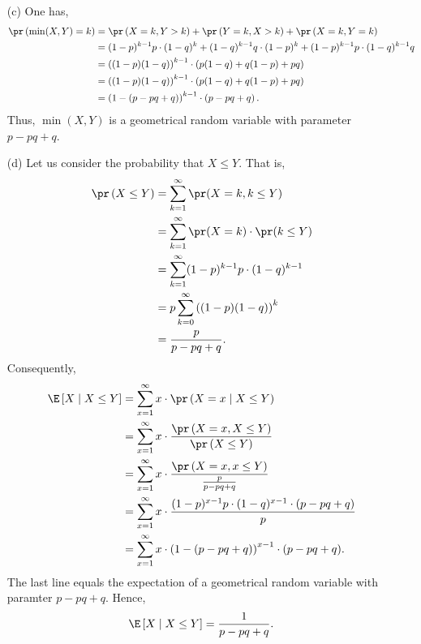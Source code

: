 \begin{enumerate}
  \item[(c)] One has,
  \begin{align*}
    \pr\left( \min(X,Y) = k \right)
      &= \pr\left( X=k, Y > k \right) + \pr\left( Y=k, X > k \right) +  \pr\left( X=k, Y=k \right) \\
      &= (1-p)^{k-1}p  \cdot (1-q)^k + (1-q)^{k-1}q \cdot (1-p)^{k} + (1-p)^{k-1}p \cdot (1-q)^{k-1}q \\
      &= \left( (1-p)(1-q) \right)^{k-1} \cdot \left( p(1-q) + q(1-p) + pq \right) \\
      &= \left( (1-p)(1-q) \right)^{k-1} \cdot \left( p(1-q) + q(1-p) + pq \right) \\
      &= \left( 1 - (p - pq + q) \right)^{k-1} \cdot \left( p - pq + q \right).
  \end{align*}
  Thus, $\min(X,Y)$ is a geometrical random variable with parameter $p - pq + q$.

  \item[(d)] Let us consider the probability that $X \leq Y$. That is,
  \begin{align*}
    \pr\left( X \leq Y \right)
      &= \sum_{k=1}^{\infty} \pr(X = k, k \leq Y) \\
      &= \sum_{k=1}^{\infty} \pr(X = k) \cdot \pr(k \leq Y) \\
      &= \sum_{k=1}^{\infty} (1-p)^{k-1}p \cdot (1-q)^{k-1} \\
      &= p \sum_{k=0}^{\infty} \left((1-p)(1-q)\right)^{k} \\
      &= \frac{p}{p - pq + q}.
  \end{align*}
  Consequently,
  \begin{align*}
    \E\left[ X \mid X \leq Y \right]
    &= \sum_{x=1}^{\infty} x \cdot \pr\left( X = x \mid X \leq Y \right) \\
    &= \sum_{x=1}^{\infty} x \cdot \frac{\pr\left( X = x, X \leq Y \right)}{\pr\left( X \leq Y \right)} \\
    &= \sum_{x=1}^{\infty} x \cdot \frac{\pr\left( X = x, x \leq Y \right)}{\frac{p}{p - pq + q}} \\
    &= \sum_{x=1}^{\infty} x \cdot \frac{(1-p)^{x-1}p \cdot (1-q)^{x-1} \cdot (p - pq + q)}{p} \\
    &= \sum_{x=1}^{\infty} x \cdot \left(1 - (p -  pq + q)\right)^{x-1} \cdot (p - pq + q).
  \end{align*}
  The last line equals the expectation of a geometrical random variable with
  paramter $p - pq + q$. Hence,
  \[
    \E\left[ X \mid X \leq Y \right] = \frac{1}{p - pq + q}.
  \]
\end{enumerate}
